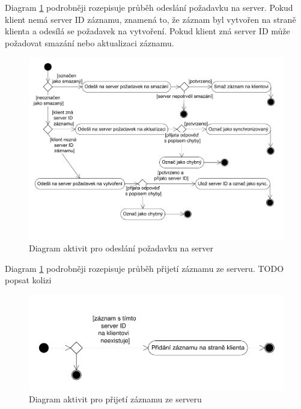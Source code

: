 \documentclass{bakalarka}
\begin{document}
Diagram \ref{obr:syncup} podrobněji rozepisuje průběh odeslání požadavku na server. Pokud klient nemá server ID záznamu, znamená to, že záznam byl vytvořen na straně klienta a odesílá se požadavek na vytvoření. Pokud klient zná server ID může požadovat smazání nebo aktualizaci záznamu. 

\begin{figure}[H]
  \centering
  \includegraphics[scale=0.7]{visio/syncup.pdf}
\caption{Diagram aktivit pro odeslání požadavku na server}
\label{obr:syncup}
\end{figure}

Diagram \ref{obr:syncup} podrobněji rozepisuje průběh přijetí záznamu ze serveru.
TODO popsat kolizi
\begin{figure}[H]
  \centering
  \includegraphics[scale=0.7]{visio/syncdown.pdf}
\caption{Diagram aktivit pro přijetí záznamu ze serveru}
\label{obr:syncdown}
\end{figure}
\end{document}
